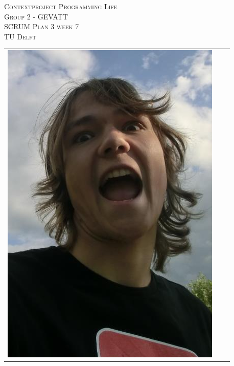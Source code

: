 \begin{titlepage}
\begin{center}
\textsc{\LARGE Contextproject Programming Life}\\
\vspace{5pt}
\textsc{\LARGE Group 2 - GEVATT}\\
\vspace{5pt}
\textsc{\LARGE SCRUM Plan 3 week 7}\\
\vspace{5pt}
\textsc{\large TU Delft}

\begin{table}[ht]
\centering
\begin{tabular}{ccc}
\includegraphics[scale=0.2]{ruben.png}   &

\end{tabular}
\end{table}
\end{center}
\end{titlepage}
